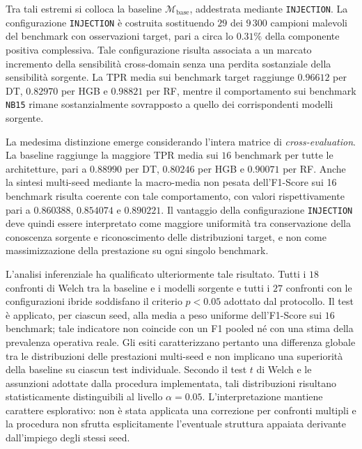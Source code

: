 Tra tali estremi si colloca la baseline $\mathcal{M}_{\mathrm{base}}$, addestrata mediante \texttt{INJECTION}. 
La configurazione \texttt{INJECTION} è costruita sostituendo $29$ dei $9\,300$ campioni malevoli del benchmark con osservazioni target, pari a circa lo $0.31\%$ della componente positiva complessiva. 
Tale configurazione risulta associata a un marcato incremento della sensibilità cross-domain senza una perdita sostanziale della sensibilità sorgente.
La TPR media sui benchmark target raggiunge $0.96612$ per DT, $0.82970$ per HGB e $0.98821$ per RF, mentre il comportamento sui benchmark \texttt{NB15} rimane sostanzialmente sovrapposto a quello dei corrispondenti modelli sorgente.

La medesima distinzione emerge considerando l'intera matrice di \textit{cross-evaluation}. 
La baseline raggiunge la maggiore TPR media sui $16$ benchmark per tutte le architetture, pari a $0.88990$ per DT, $0.80246$ per HGB e $0.90071$ per RF. 
Anche la sintesi multi-seed mediante la macro-media non pesata dell'F1-Score sui 16 benchmark risulta coerente con tale comportamento, con valori rispettivamente pari a $0.860388$, $0.854074$ e $0.890221$. 
Il vantaggio della configurazione \texttt{INJECTION} deve quindi essere interpretato come maggiore uniformità tra conservazione della conoscenza sorgente e riconoscimento delle distribuzioni target, e non come massimizzazione della prestazione su ogni singolo benchmark.

L'analisi inferenziale ha qualificato ulteriormente tale risultato. 
Tutti i $18$ confronti di Welch tra la baseline e i modelli sorgente e tutti i $27$ confronti con le configurazioni ibride soddisfano il criterio $p<0.05$ adottato dal protocollo. 
Il test è applicato, per ciascun seed, alla media a peso uniforme dell'F1-Score sui $16$ benchmark; tale indicatore non coincide con un F1 pooled né con una stima della prevalenza operativa reale. Gli esiti caratterizzano pertanto una differenza globale tra le distribuzioni delle prestazioni multi-seed e non implicano una superiorità della baseline su ciascun test individuale. 
Secondo il test $t$ di Welch e le assunzioni adottate dalla procedura implementata, tali distribuzioni risultano statisticamente distinguibili al livello $\alpha=0.05$. 
L'interpretazione mantiene carattere esplorativo: non è stata applicata una correzione per confronti multipli e la procedura non sfrutta esplicitamente l'eventuale struttura appaiata derivante dall'impiego degli stessi seed.

